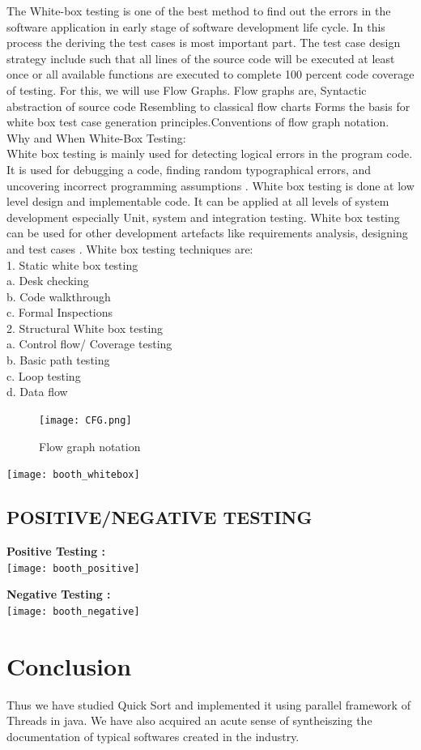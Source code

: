 \documentclass[10pt,a4paper]{article}
\begin{document}
The White-box testing is one of the best method to find out the errors in the software application in early stage of software development life cycle. In this process the deriving the test cases is most important part. The test case design strategy include such that all lines of the source code will be executed at least once or all available functions are executed to complete 100 percent  code coverage of testing. For this, we will use Flow Graphs. Flow graphs are, Syntactic abstraction of source code Resembling to classical flow charts Forms the basis for white box test case generation principles.Conventions of flow graph notation. \\
Why and When White-Box Testing:\\
White box testing is mainly used for detecting logical errors in the program code. It is used for
debugging a code, finding random typographical errors, and uncovering incorrect programming
assumptions .
White box testing is done at low level design and implementable code. It can be applied at all levels of
system development especially Unit, system and integration testing. White box testing can be used for
other development artefacts like requirements analysis, designing and test cases .
White box testing techniques are:\\
1. Static white box testing\\
a. Desk checking\\
b. Code walkthrough\\
c. Formal Inspections\\
2. Structural White box testing\\
a. Control flow/ Coverage testing\\
b. Basic path testing\\
c. Loop testing\\
d. Data flow \\

	\begin{figure}[h!]
		\centering
		\texttt{[image: CFG.png]}
		\caption{Flow graph notation}
	\end{figure}

\texttt{[image: booth\_whitebox]}

\subsection{ POSITIVE/NEGATIVE TESTING }

\textbf{Positive Testing :}\\
\texttt{[image: booth\_positive]}
\vspace{30px}

\textbf{Negative Testing :}\\
\texttt{[image: booth\_negative]}
\vspace{30px}

\section{Conclusion}
Thus we have studied Quick Sort and implemented it using parallel framework of Threads in java. We have also acquired an acute sense of syntheiszing the documentation of typical softwares created in the industry.
\end{document}
